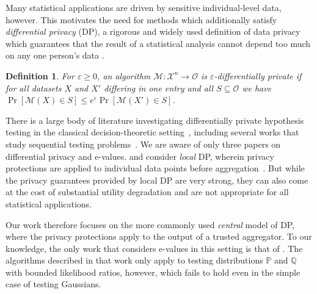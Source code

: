 \documentclass{article}
\newcommand{\Null}{\mathbb{P}}
\newcommand{\Alt}{\mathbb{Q}}
\newcommand{\M}{\mathcal{M}}
\newcommand{\eps}{\varepsilon}
\newcommand{\cM}{\mathcal{M}}
\newcommand{\cO}{\mathcal{O}}
\newcommand{\cX}{\mathcal{X}}
\newtheorem{definition}{Definition}[section]
\begin{document}
Many statistical applications are driven by sensitive individual-level data, however. This motivates the need for methods which additionally satisfy \emph{differential privacy} (DP), a rigorous and widely used definition of data privacy which guarantees that the result of a statistical analysis cannot depend too much on any one person's data \cite{dwork2014algorithmic,fioretto2025differential,abowd2018us}. 
\begin{definition}
    For $\eps\ge 0$, an algorithm $\M:\cX^n\to\cO$ is \emph{$\eps$-differentially private} if for all datasets $X$ and $X'$ differing in one entry and all $S\subseteq \cO$ we have 
    $\Pr[\cM(X)\in S]\le e^\eps \Pr[\M(X')\in S]$.
\end{definition}

There is a large body of literature investigating differentially private hypothesis testing in the classical decision-theoretic setting~\citep{canonne2019structure,5360513,kazan2023testtestsframeworkdifferentially,kifer2016newclassprivatechisquare,wang2017revisitingdifferentiallyprivatehypothesis,swanberg2019improveddifferentiallyprivateanalysis,Covington_2024}, including several works that study sequential testing problems~\citep{cummings2018differentiallyprivatechangepointdetection,zhang2022DPSPRT,michel2026dpsprtdifferentiallyprivatesequential,nikolakakis2022quantilemultiarmedbanditsoptimal,azize2026differentiallyprivatebestarmidentification}. 
We are aware of only three papers on differential privacy and e-values. 
\citet{waudbysmith2024nonparametricextensionsrandomizedresponse} and \citet{saha2026optimalevariablesconstraints} consider \emph{local} DP, wherein privacy protections are applied to individual data points before aggregation~\citep{kasiviswanathan2011can}. 
But while the privacy guarantees provided by local DP are very strong, they can also come at the cost of substantial utility degradation and are not appropriate for all statistical applications.

Our work therefore focuses on the more commonly used \emph{central} model of DP, where the privacy protections apply to the output of a  trusted aggregator. 
To our knowledge, the only work that considers e-values in this setting is that of \citet{csillagDifferentiallyPrivateEValues2025a}.
The algorithms described in that work only apply to testing distributions $\Null$ and $\Alt$ with bounded likelihood ratios, however, which fails to hold even in the simple case of testing Gaussians.
\end{document}
